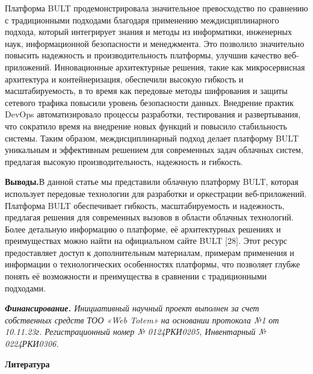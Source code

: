 \documentclass[
]{article}
\begin{document}
Платформа BULT продемонстрировала значительное превосходство по
сравнению с традиционными подходами благодаря применению
междисциплинарного подхода, который интегрирует знания и методы из
информатики, инженерных наук, информационной безопасности и менеджмента.
Это позволило значительно повысить надежность и производительность
платформы, улучшив качество веб-приложений. Инновационные архитектурные
решения, такие как микросервисная архитектура и контейнеризация,
обеспечили высокую гибкость и масштабируемость, в то время как передовые
методы шифрования и защиты сетевого трафика повысили уровень
безопасности данных. Внедрение практик DevOps автоматизировало процессы
разработки, тестирования и развертывания, что сократило время на
внедрение новых функций и повысило стабильность системы. Таким образом,
междисциплинарный подход делает платформу BULT уникальным и эффективным
решением для современных задач облачных систем, предлагая высокую
производительность, надежность и гибкость.

\textbf{Выводы.}В данной статье мы представили облачную платформу BULT,
которая использует передовые технологии для разработки и оркестрации
веб-приложений. Платформа BULT обеспечивает гибкость, масштабируемость и
надежность, предлагая решения для современных вызовов в области облачных
технологий. Более детальную информацию о платформе, её архитектурных
решениях и преимуществах можно найти на официальном сайте BULT {[}28{]}.
Этот ресурс предоставляет доступ к дополнительным материалам, примерам
применения и информации о технологических особенностях платформы, что
позволяет глубже понять её возможности и преимущества в сравнении с
традиционными подходами.

\emph{\textbf{Финансирование.} Инициативный научный проект выполнен за
счет собственных средств ТОО «Web Totem» на основании протокола №1 от
10.11.23г. Регистрационный номер № 0124РКИ0205, Инвентарный №
0224РКИ0306.}

\textbf{Литература}
\end{document}
